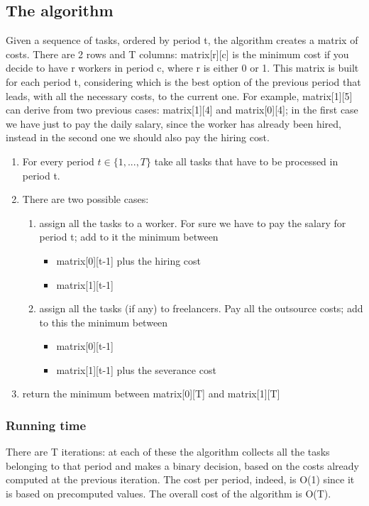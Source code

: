\subsection{The algorithm}
Given a sequence of tasks, ordered by period t, the algorithm creates a matrix of costs. There are 2 rows and T columns: matrix[r][c] is the minimum cost if you decide to have r workers in period c, where r is either 0 or 1. This matrix is built for each period t, considering which is the best option of the previous period that leads, with all the necessary costs, to the current one. For example, matrix[1][5] can derive from two previous cases: matrix[1][4] and matrix[0][4]; in the first case we have just to pay the daily salary, since the worker has already been hired, instead in the second one we should also pay the hiring cost.
\begin{enumerate}
	\item For every period $t \in \{1,..., T\}$ take all tasks that have to be processed in period t.
	\item There are two possible cases:
	\begin{enumerate}
		\item assign all the tasks to a worker. For sure we have to pay the salary for period t; add to it the minimum between
		\begin{itemize}
			\item matrix[0][t-1] plus the hiring cost
			\item matrix[1][t-1]
		\end{itemize} 
		\item assign all the tasks (if any) to freelancers. Pay all the outsource costs; add to this the minimum between
		\begin{itemize}
			\item matrix[0][t-1]
			\item matrix[1][t-1] plus the severance cost
		\end{itemize}
	\end{enumerate}
	\item return the minimum between matrix[0][T] and matrix[1][T]
\end{enumerate}

\subsubsection{Running time}
There are T iterations: at each of these the algorithm collects all the tasks belonging to that period and makes a binary decision, based on the costs already computed at the previous iteration. The cost per period, indeed, is O(1) since it is based on precomputed values. The overall cost of the algorithm is O(T).

